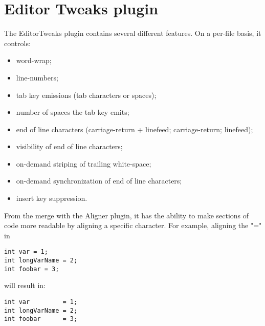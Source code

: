 \section{Editor Tweaks plugin}\label{sec:editor_tweaks}

The EditorTweaks plugin contains several different features. On a per-file basis, it controls:

\begin{itemize}[noitemsep]
\item word-wrap;
\item line-numbers;
\item tab key emissions (tab characters or spaces);
\item number of spaces the tab key emits;
\item end of line characters (carriage-return + linefeed; carriage-return; linefeed);
\item visibility of end of line characters;
\item on-demand striping of trailing white-space;
\item on-demand synchronization of end of line characters;
\item insert key suppression.
\end{itemize}

From the merge with the Aligner plugin, it has the ability to make sections of code more readable by aligning a specific character.\newline
For example, aligning the "=" in 

\begin{lstlisting}
int var = 1;
int longVarName = 2;
int foobar = 3;
\end{lstlisting}

will result in:

\begin{lstlisting}
int var         = 1;
int longVarName = 2;
int foobar      = 3;
\end{lstlisting}


